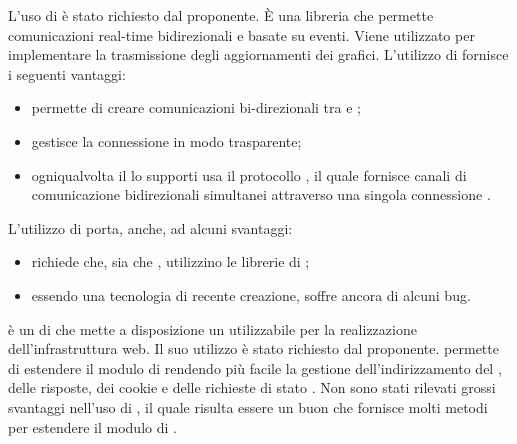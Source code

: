 L'uso di  è stato richiesto dal proponente. È una libreria  che permette comunicazioni real-time bidirezionali e basate su eventi. Viene utilizzato per implementare la trasmissione degli aggiornamenti dei grafici.
L'utilizzo di  fornisce i seguenti vantaggi:
\begin{itemize}
\item permette di creare comunicazioni bi-direzionali tra  e ;
\item gestisce la connessione in modo trasparente;
\item ogniqualvolta il  lo supporti usa il protocollo , il quale fornisce canali di comunicazione bidirezionali simultanei attraverso una singola connessione .
\end{itemize}
L'utilizzo di  porta, anche, ad alcuni svantaggi:
\begin{itemize}
	\item richiede che, sia  che , utilizzino le librerie di ;
	\item essendo una tecnologia di recente creazione, soffre ancora di alcuni bug.
\end{itemize}

 è un  di  che mette a disposizione un  utilizzabile per la realizzazione dell'infrastruttura web. Il suo utilizzo è stato richiesto dal proponente.
 permette di estendere il modulo \texttt{} di  rendendo più facile la gestione dell'indirizzamento del , delle risposte, dei cookie e delle richieste di stato .
Non sono stati rilevati grossi svantaggi nell'uso di , il quale risulta essere un buon  che fornisce molti metodi per estendere il modulo  di .

